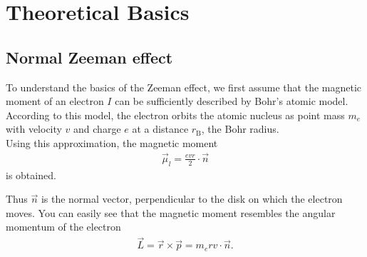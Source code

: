 \section{Theoretical Basics}
\subsection{Normal Zeeman effect}
To understand the basics of the Zeeman effect, we first assume that the magnetic moment of an electron $I$ can be sufficiently described by Bohr's atomic model.
According to this model, the electron orbits the atomic nucleus as point mass $m_e$ with velocity $v$ and charge $e$ at a distance $r_\text{B}$, the Bohr radius.\\
Using this approximation, the magnetic moment
\begin{align}
\vec{\mu}_l = \frac{evr}{2}\cdot\vec{n}
\end{align}
is obtained.


Thus $\vec{n}$ is the normal vector, perpendicular to the disk on which the electron moves.
You can easily see that the magnetic moment resembles the angular momentum of the electron
\begin{align}
\vec{L} = \vec{r} \times \vec{p} = m_e r v \cdot \vec{n}.
\end{align}